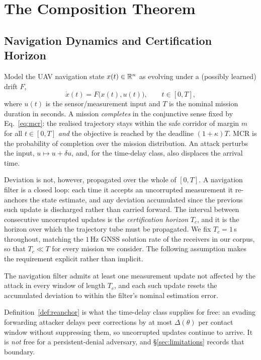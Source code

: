 \section{The Composition Theorem}
\label{sec:theorem}
\subsection{Navigation Dynamics and Certification Horizon}
Model the UAV navigation state $x(t)\in\mathbb{R}^n$ as evolving under a (possibly
learned) drift $F$,
\begin{equation}
\label{eq:ode}
\dot{x}(t) = F\big(x(t), u(t)\big), \qquad t\in[0,T],
\end{equation}
where $u(t)$ is the sensor/measurement input and $T$ is the nominal mission
duration in seconds. A mission \emph{completes} in the conjunctive sense fixed
by Eq.~\eqref{eq:mcr}: the realised trajectory stays within the safe corridor of
margin $m$ for all $t\in[0,T]$ \emph{and} the objective is reached by the
deadline $(1+\kappa)T$. MCR is the probability of completion over the mission
distribution. An attack perturbs the input, $u\mapsto u+\delta u$, and, for the
time-delay class, also displaces the arrival time.

Deviation is not, however, propagated over the whole of $[0,T]$. A navigation
filter is a closed loop: each time it accepts an uncorrupted measurement it
re-anchors the state estimate, and any deviation accumulated since the previous
such update is discharged rather than carried forward. The interval between
consecutive uncorrupted updates is the \emph{certification horizon} $T_c$, and
it is the horizon over which the trajectory tube must be propagated. We fix
$T_c=1$\,s throughout, matching the $1$\,Hz GNSS solution rate of the receivers
in our corpus, so that $T_c\ll T$ for every mission we consider. The following
assumption makes the requirement explicit rather than implicit.

\begin{definition}
\label{def:reanchor}
The navigation filter admits at least one measurement update not affected by the
attack in every window of length $T_c$, and each such update resets the
accumulated deviation to within the filter's nominal estimation error.
\end{definition}

Definition~\ref{def:reanchor} is what the time-delay class supplies for free: an
evading forwarding attacker delays peer corrections by at most $\Delta(\theta)$
per contact window without suppressing them, so uncorrupted updates continue to
arrive. It is \emph{not} free for a persistent-denial adversary, and
\S\ref{sec:limitations} records that boundary.

